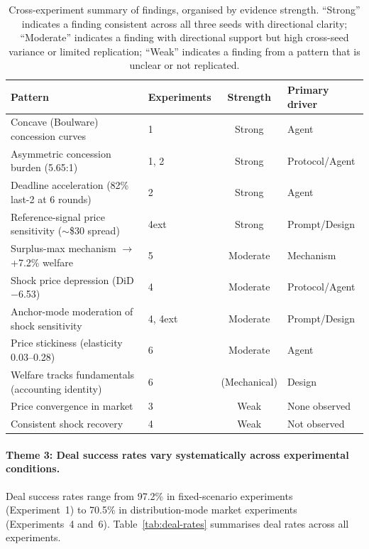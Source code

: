 \begin{table}[ht]
\centering
\caption{Cross-experiment summary of findings, organised by evidence strength.  ``Strong'' indicates a finding consistent across all three seeds with directional clarity; ``Moderate'' indicates a finding with directional support but high cross-seed variance or limited replication; ``Weak'' indicates a finding from a pattern that is unclear or not replicated.}
\label{tab:synthesis}
\small
\begin{tabular}{@{}llcl@{}}
\toprule
Pattern & Experiments & Strength & Primary driver \\
\midrule
Concave (Boulware) concession curves & 1 & Strong & Agent \\
Asymmetric concession burden (5.65:1) & 1, 2 & Strong & Protocol/Agent \\
Deadline acceleration (82\% last-2 at 6 rounds) & 2 & Strong & Agent \\
Reference-signal price sensitivity ($\sim$\$30 spread) & 4ext & Strong & Prompt/Design \\
Surplus-max mechanism $\to$ +7.2\% welfare & 5 & Moderate & Mechanism \\
Shock price depression (DiD $-$6.53) & 4 & Moderate & Protocol/Agent \\
Anchor-mode moderation of shock sensitivity & 4, 4ext & Moderate & Prompt/Design \\
Price stickiness (elasticity 0.03--0.28) & 6 & Moderate & Agent \\
Welfare tracks fundamentals (accounting identity) & 6 & (Mechanical) & Design \\
Price convergence in market & 3 & Weak & None observed \\
Consistent shock recovery & 4 & Weak & Not observed \\
\bottomrule
\end{tabular}
\end{table}

\paragraph{Theme 3: Deal success rates vary systematically across experimental conditions.}
Deal success rates range from 97.2\% in fixed-scenario experiments (Experiment~1) to 70.5\% in distribution-mode market experiments (Experiments~4 and~6).  Table~\ref{tab:deal-rates} summarises deal rates across all experiments.

